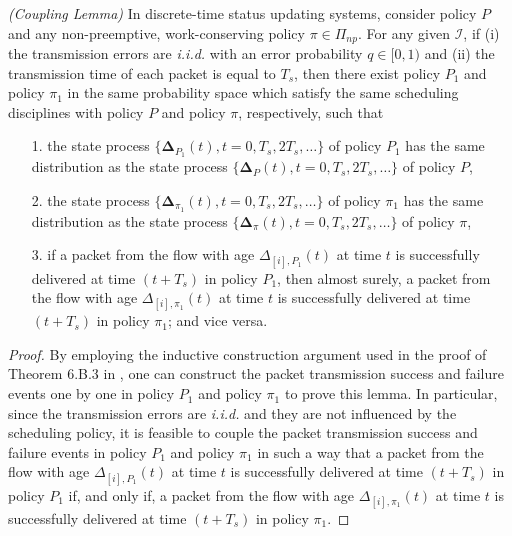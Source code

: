 \begin{lemma}\emph{(Coupling Lemma)}\label{coupling_4}
In discrete-time status updating systems, consider policy $P$ and any {non-preemptive, work-conserving} policy $\pi\in \Pi_{np}$. For any given $\mathcal{I}$, if (i) the transmission errors are \emph{i.i.d.} with an error probability $q\in [0,1)$ and (ii) the transmission time of each packet is equal to $T_s$,
 then there exist policy $P_1$ and policy $\pi_1$ in the same probability space which satisfy the same scheduling disciplines with policy $P$ and policy $\pi$, respectively,  such that 
\begin{itemize}
\itemsep0em 
\item[1.] the state process $\{\bm\Delta_{P_1}(t),t=0,T_s,2T_s,\ldots\}$ of policy $P_1$ has the same distribution as the state process $\{\bm\Delta_{P}(t),t=0,T_s,2T_s,\ldots\}$ of policy $P$,
\item[2.] the state process $\{\bm\Delta_{\pi_1}(t),t=0,T_s,2T_s,\ldots\}$ of policy $\pi_1$ has the same distribution as the state process $\{\bm\Delta_{\pi}(t),t=0,T_s,2T_s,\ldots\}$  of policy $\pi$,
\item[3.] if a packet from the flow with age $\Delta_{[i],P_1}(t)$ at time $t$ is successfully delivered  at time $(t + T_s)$ in policy $P_1$, then almost surely, a packet from the flow with age $\Delta_{[i],\pi_1}(t)$ at time $t$ is successfully delivered  at time $(t+ T_s)$ in policy $\pi_1$; and vice versa.
\end{itemize} 
\end{lemma}

\begin{proof}
By employing the inductive construction argument used in the proof of Theorem 6.B.3 in \cite{StochasticOrderBook}, one can construct the packet transmission success and failure events one by one in policy $P_1$ and policy $\pi_1$ to prove this lemma. 
In particular, since the transmission errors are \emph{i.i.d.} and they are not influenced by the scheduling policy, it is feasible to couple the packet transmission success and failure events in policy $P_1$ and policy $\pi_1$ in such a way that a packet from the flow with age $\Delta_{[i],P_1}(t)$ at time $t$ is successfully delivered at time $(t+ T_s)$ in policy $P_1$ if, and only if, a packet from the flow with age $\Delta_{[i],\pi_1}(t)$ at time $t$ is successfully delivered  at time $(t+ T_s)$ in policy $\pi_1$. \end{proof}

